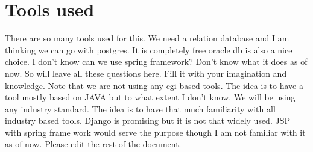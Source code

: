 \documentclass[a4paper,twoside]{article}
\begin{document}
\section{Tools used}
There are so many tools used for this. We need a relation database and I am thinking we can go with postgres. It is completely free oracle db is also a nice choice. I don't know can we use spring framework? Don't know what it does as of now. So will leave all these questions here. Fill it with your imagination and knowledge. Note that we are not using any cgi based tools. The idea is to have a tool mostly based on JAVA but to what extent I don't know. We will be using any industry standard. The idea is to have that much familiarity with all industry based tools. Django is promising but it is not that widely used. JSP with spring frame work would serve the purpose though I am not familiar with it as of now. Please edit the rest of the document. 
\end{document}
